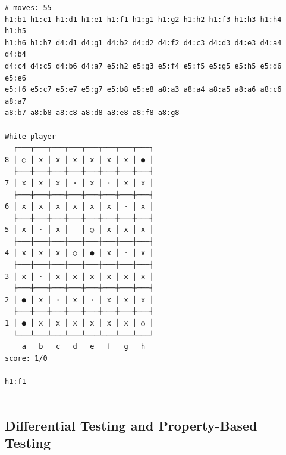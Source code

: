 \documentclass[12pt,a4paper,twoside,openright]{book}
\begin{document}
\begin{mdframed}[skipabove=\baselineskip,skipbelow=0pt,hidealllines=true,backgroundcolor=black!3,innerleftmargin=10pt,innerrightmargin=5pt,innertopmargin=0pt,innerbottommargin=5pt]
{\begin{verbatim}
# moves: 55
h1:b1 h1:c1 h1:d1 h1:e1 h1:f1 h1:g1 h1:g2 h1:h2 h1:f3 h1:h3 h1:h4 h1:h5
h1:h6 h1:h7 d4:d1 d4:g1 d4:b2 d4:d2 d4:f2 d4:c3 d4:d3 d4:e3 d4:a4 d4:b4
d4:c4 d4:c5 d4:b6 d4:a7 e5:h2 e5:g3 e5:f4 e5:f5 e5:g5 e5:h5 e5:d6 e5:e6
e5:f6 e5:c7 e5:e7 e5:g7 e5:b8 e5:e8 a8:a3 a8:a4 a8:a5 a8:a6 a8:c6 a8:a7
a8:b7 a8:b8 a8:c8 a8:d8 a8:e8 a8:f8 a8:g8

White player
  ┌───┬───┬───┬───┬───┬───┬───┬───┐
8 │ ○ │ x │ x │ x │ x │ x │ x │ ● │
  ├───┼───┼───┼───┼───┼───┼───┼───┤
7 │ x │ x │ x │ · │ x │ · │ x │ x │
  ├───┼───┼───┼───┼───┼───┼───┼───┤
6 │ x │ x │ x │ x │ x │ x │ · │ x │
  ├───┼───┼───┼───┼───┼───┼───┼───┤
5 │ x │ · │ x │   │ ○ │ x │ x │ x │
  ├───┼───┼───┼───┼───┼───┼───┼───┤
4 │ x │ x │ x │ ○ │ ● │ x │ · │ x │
  ├───┼───┼───┼───┼───┼───┼───┼───┤
3 │ x │ · │ x │ x │ x │ x │ x │ x │
  ├───┼───┼───┼───┼───┼───┼───┼───┤
2 │ ● │ x │ · │ x │ · │ x │ x │ x │
  ├───┼───┼───┼───┼───┼───┼───┼───┤
1 │ ● │ x │ x │ x │ x │ x │ x │ ○ │
  └───┴───┴───┴───┴───┴───┴───┴───┘
    a   b   c   d   e   f   g   h
score: 1/0

h1:f1


\end{verbatim}
}
\end{mdframed}
\begin{mdframed}[skipabove=0pt,skipbelow=\baselineskip,hidealllines=true,innerleftmargin=10pt,innerrightmargin=5pt,innertopmargin=3pt,innerbottommargin=3pt]
\label{lst:random_games_testing_exec}
\end{mdframed}

\subsection{Differential Testing and Property-Based Testing}
\end{document}
